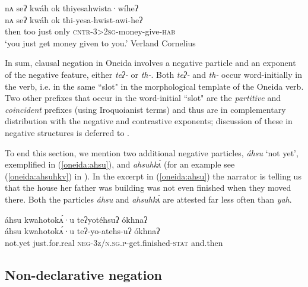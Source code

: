 \documentclass[output=paper,colorlinks,citecolor=brown]{langscibook}
\begin{document}
\ea\label{oneida:true-cont}
    \glll nʌ seʔ kwáh ok thiyesahwista·wíheʔ \\
    nʌ seʔ kwáh ok thi-yesa-hwist-awi-heʔ \\
     then too just only \textsc{cntr-3>2sg}-money-give-\textsc{hab} \\
    \glt  `you just get money given to you.' Verland Cornelius \citep[322(100)]{MichelsonEtAl2016}
\z
 
 
In sum, clausal negation in Oneida involves a negative particle and an exponent of the negative feature, either \textit{teʔ-} or \textit{th-}. Both \textit{teʔ-} and \textit{th-} occur word-initially in the verb, i.e. in the same ``slot" in the morphological template of the Oneida verb. Two other prefixes that occur in the word-initial ``slot" are the \textit{partitive} and \textit{coincident} prefixes (using Iroquoianist terms) and thus are in complementary distribution with the negative and contrastive exponents; discussion of these in negative structures is deferred to .

To end this section, we mention two additional negative particles, \textit{áhsu} `not yet', exemplified in (\ref{oneida:ahsu}), and \textit{ahsuhkʌ́} (for an example see (\ref{oneida:ahsuhkv}) in ). In the excerpt in (\ref{oneida:ahsu}) the narrator is telling us that the house her father was building was not even finished when they moved there. Both the particles \textit{áhsu} and \textit{ahsuhkʌ́} are attested far less often than \textit{yah}.

\ea\label{oneida:ahsu} 
    {\glll áhsu kwahotokʌ́·u teʔyotéhsuʔ \'okhnaʔ \\
    áhsu kwahotokʌ́·u teʔ-yo-atehs-uʔ \'okhnaʔ  \\
    {not.yet} {just.for.real} \textsc{neg-3z/n.sg.p}-get.finished-\textsc{stat} {and.then} \\}
\z%

\subsection{Non-declarative negation}
\label{oneida:sec:non-declarative}
\end{document}
